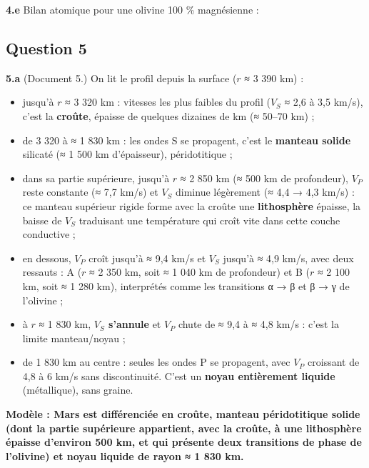 \documentclass[11pt,a4paper]{article}
\providecommand{\tightlist}{\setlength{\itemsep}{0pt}\setlength{\parskip}{0pt}}
\newcommand{\equationajustee}[1]{%
  \sbox{\boiteequation}{$\displaystyle #1$}%
  \ifdim\wd\boiteequation>\linewidth
    \[\resizebox{\linewidth}{!}{\usebox{\boiteequation}}\]%
  \else
    \[#1\]%
  \fi}
\begin{document}
\textbf{4.e} Bilan atomique pour une olivine 100 \% magnésienne :

\equationajustee{\mathrm{Mg_2SiO_4 \longrightarrow MgSiO_3 + MgO}}

\equationajustee{\boxed{\text{bridgmanite} = \mathrm{MgSiO_3}}}

\hypertarget{question-5}{%
\subsection{Question 5}\label{question-5}}

\textbf{5.a} (Document 5.) On lit le profil depuis la surface (\(r\) ≈ 3 390 km) :

\begin{itemize}
\tightlist
\item
  jusqu'à \(r\) ≈ 3 320 km : vitesses les plus faibles du profil (\(V_S\) ≈ 2,6 à 3,5 km/s), c'est la \textbf{croûte}, épaisse de quelques dizaines de km (≈ 50--70 km) ;
\item
  de 3 320 à ≈ 1 830 km : les ondes S se propagent, c'est le \textbf{manteau solide} silicaté (≈ 1 500 km d'épaisseur), péridotitique ;
\item
  dans sa partie supérieure, jusqu'à \(r\) ≈ 2 850 km (≈ 500 km de profondeur), \(V_P\) reste constante (≈ 7,7 km/s) et \(V_S\) diminue légèrement (≈ 4,4 → 4,3 km/s) : ce manteau supérieur rigide forme avec la croûte une \textbf{lithosphère} épaisse, la baisse de \(V_S\) traduisant une température qui croît vite dans cette couche conductive ;
\item
  en dessous, \(V_P\) croît jusqu'à ≈ 9,4 km/s et \(V_S\) jusqu'à ≈ 4,9 km/s, avec deux ressauts : A (\(r\) ≈ 2 350 km, soit ≈ 1 040 km de profondeur) et B (\(r\) ≈ 2 100 km, soit ≈ 1 280 km), interprétés comme les transitions α → β et β → γ de l'olivine ;
\item
  à \(r\) ≈ 1 830 km, \textbf{\(V_S\) s'annule} et \(V_P\) chute de ≈ 9,4 à ≈ 4,8 km/s : c'est la limite manteau/noyau ;
\item
  de 1 830 km au centre : seules les ondes P se propagent, avec \(V_P\) croissant de 4,8 à 6 km/s sans discontinuité. C'est un \textbf{noyau entièrement liquide} (métallique), sans graine.
\end{itemize}

\textbf{Modèle : Mars est différenciée en croûte, manteau péridotitique solide (dont la partie supérieure appartient, avec la croûte, à une lithosphère épaisse d'environ 500 km, et qui présente deux transitions de phase de l'olivine) et noyau liquide de rayon ≈ 1 830 km.}
\end{document}
